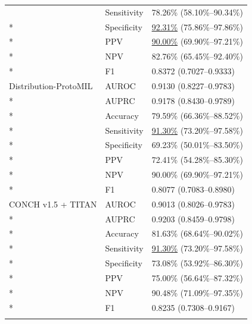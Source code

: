 \begin{longtable}{@{}p{}p{}p{}@{}}
 & Sensitivity & 78.26\% (58.10\%--90.34\%) \\*

 & Specificity & \underline{92.31\%} (75.86\%--97.86\%) \\*

 & PPV & \underline{90.00\%} (69.90\%--97.21\%) \\*

 & NPV & 82.76\% (65.45\%--92.40\%) \\*

 & F1 & 0.8372 (0.7027--0.9333) \\

\addlinespace

Distribution-ProtoMIL & AUROC & 0.9130 (0.8227--0.9783) \\*

 & AUPRC & 0.9178 (0.8430--0.9789) \\*

 & Accuracy & 79.59\% (66.36\%--88.52\%) \\*

 & Sensitivity & \underline{91.30\%} (73.20\%--97.58\%) \\*

 & Specificity & 69.23\% (50.01\%--83.50\%) \\*

 & PPV & 72.41\% (54.28\%--85.30\%) \\*

 & NPV & 90.00\% (69.90\%--97.21\%) \\*

 & F1 & 0.8077 (0.7083--0.8980) \\

\addlinespace

CONCH v1.5 + TITAN & AUROC & 0.9013 (0.8026--0.9783) \\*

 & AUPRC & 0.9203 (0.8459--0.9798) \\*

 & Accuracy & 81.63\% (68.64\%--90.02\%) \\*

 & Sensitivity & \underline{91.30\%} (73.20\%--97.58\%) \\*

 & Specificity & 73.08\% (53.92\%--86.30\%) \\*

 & PPV & 75.00\% (56.64\%--87.32\%) \\*

 & NPV & 90.48\% (71.09\%--97.35\%) \\*

 & F1 & 0.8235 (0.7308--0.9167) \\

\addlinespace

\end{longtable}
\endgroup\normalsize

